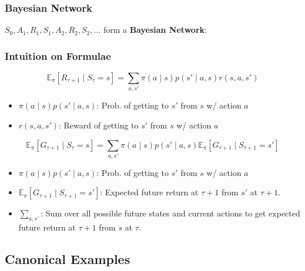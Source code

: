 \subsubsection{Bayesian Network}
\begin{definition}
    $S_0,A_1,R_1,S_1,A_2,R_2,S_2,\ldots$ form a \textbf{Bayesian Network}:
\end{definition}

\subsubsection{Intuition on Formulae}
\begin{notes}
    \begin{equation*}
        \mathbb{E}_{\pi}[R_{\tau+1} \mid S_{\tau} = s] = \sum_{a, s'} \pi(a \mid s) p(s' \mid a, s) r(s, a, s')
    \end{equation*}
    \begin{itemize}
        \item $\pi(a \mid s) p(s' \mid a, s)$: Prob. of getting to $s'$ from $s$ w/ action $a$
        \item $r(s, a, s')$: Reward of getting to $s'$ from $s$ w/ action $a$
    \end{itemize}
    \vspace{1em}

    \begin{equation*}
        \mathbb{E}_{\pi}[G_{\tau+1} \mid S_{\tau} = s] = \sum_{a, s'} \pi(a \mid s) p(s' \mid a, s) \mathbb{E}_{\pi}[G_{\tau+1} \mid S_{\tau+1} = s']
    \end{equation*}
    \begin{itemize}
        \item $\pi(a \mid s) p(s' \mid a, s)$: Prob. of getting to $s'$ from $s$ w/ action $a$
        \item $\mathbb{E}_{\pi}[G_{\tau+1} \mid S_{\tau+1} = s']$: Expected future return at $\tau + 1$ from $s'$ at $\tau + 1$.
        \item $\sum_{a, s'}$: Sum over all possible future states and current actions to get expected future return at $\tau + 1$ from $s$ at $\tau$.
    \end{itemize}
\end{notes}
\newpage

\subsection{Canonical Examples}
